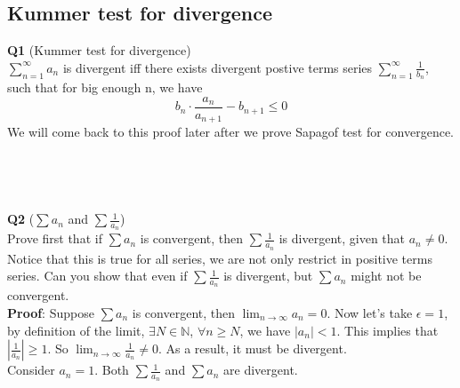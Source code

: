 \documentclass{article}
\begin{document}
\subsection{Kummer test for divergence}
\textbf{Q1} (Kummer test for divergence)\\
$\sum_{n=1}^{\infty} a_n$ is divergent iff there exists divergent postive terms series 
$\sum_{n=1}^{\infty} \frac{1}{b_n}$, such that for big enough n, we have
$$
b_n \cdot \frac{a_n}{a_{n+1}} - b_{n+1} \leq 0
$$
We will come back to this proof later after we prove Sapagof test for convergence.\\
\\
\\
\\
\\
\textbf{Q2} ($\sum a_n$ and  $\sum \frac{1}{a_n}$)\\
Prove first that if $\sum a_n$ is convergent, then $\sum \frac{1}{a_n}$ is divergent, given that $a_n \ne 0$.
Notice that this is true for all series, we are not only restrict in positive terms series. Can you show that even 
if $\sum \frac{1}{a_n}$ is divergent, but $\sum{a_n}$ might not be convergent.\\
\textbf{Proof}: Suppose $\sum a_n$ is convergent, then $\lim_{n \to \infty} a_n = 0$. Now let's take $\epsilon = 1$,
by definition of the limit, $\exists N \in \mathbb{N}$, $\forall n \geq N$, we have $\left | a_n \right | < 1$. This 
implies that $\left| \frac{1}{a_n} \right| \geq 1$. So $\lim_{n \to \infty} \frac{1}{a_n} \ne 0 $. As a result, it must be divergent.\\
Consider $a_n = 1$. Both $\sum \frac{1}{a_n}$ and $\sum a_n$ are divergent.\\
\\
\\
\\
\\
\end{document}
